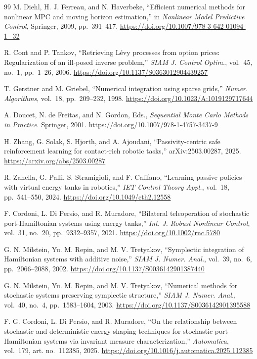 \documentclass[11pt]{article}
\begin{document}
\begin{thebibliography}{99}
M. Diehl, H. J. Ferreau, and N. Haverbeke,
``Efficient numerical methods for nonlinear MPC and moving horizon
estimation,''
in \emph{Nonlinear Model Predictive Control}, Springer, 2009, pp.~391--417.
\url{https://doi.org/10.1007/978-3-642-01094-1_32}

R. Cont and P. Tankov,
``Retrieving L\'{e}vy processes from option prices: Regularization of an
ill-posed inverse problem,''
\emph{SIAM J. Control Optim.}, vol.~45, no.~1, pp.~1--26, 2006.
\url{https://doi.org/10.1137/S0363012904439257}

T. Gerstner and M. Griebel,
``Numerical integration using sparse grids,''
\emph{Numer. Algorithms}, vol.~18, pp.~209--232, 1998.
\url{https://doi.org/10.1023/A:1019129717644}

A. Doucet, N. de Freitas, and N. Gordon, Eds.,
\emph{Sequential Monte Carlo Methods in Practice}. Springer, 2001.
\url{https://doi.org/10.1007/978-1-4757-3437-9}

H. Zhang, G. Solak, S. Hjorth, and A. Ajoudani,
``Passivity-centric safe reinforcement learning for contact-rich robotic
tasks,''
arXiv:2503.00287, 2025.
\url{https://arxiv.org/abs/2503.00287}

R. Zanella, G. Palli, S. Stramigioli, and F. Califano,
``Learning passive policies with virtual energy tanks in robotics,''
\emph{IET Control Theory Appl.}, vol.~18, pp.~541--550, 2024.
\url{https://doi.org/10.1049/cth2.12558}

F. Cordoni, L. Di Persio, and R. Muradore,
``Bilateral teleoperation of stochastic port-Hamiltonian systems using
energy tanks,''
\emph{Int. J. Robust Nonlinear Control}, vol.~31, no.~20, pp.~9332--9357, 2021.
\url{https://doi.org/10.1002/rnc.5780}

G. N. Milstein, Yu. M. Repin, and M. V. Tretyakov,
``Symplectic integration of Hamiltonian systems with additive noise,''
\emph{SIAM J. Numer. Anal.}, vol.~39, no.~6, pp.~2066--2088, 2002.
\url{https://doi.org/10.1137/S0036142901387440}

G. N. Milstein, Yu. M. Repin, and M. V. Tretyakov,
``Numerical methods for stochastic systems preserving symplectic structure,''
\emph{SIAM J. Numer. Anal.}, vol.~40, no.~4, pp.~1583--1604, 2003.
\url{https://doi.org/10.1137/S0036142901395588}

F. G. Cordoni, L. Di Persio, and R. Muradore,
``On the relationship between stochastic and deterministic energy shaping
techniques for stochastic port-Hamiltonian systems via invariant measure
characterization,''
\emph{Automatica}, vol.~179, art. no.~112385, 2025.
\url{https://doi.org/10.1016/j.automatica.2025.112385}


\end{thebibliography}
\end{document}
